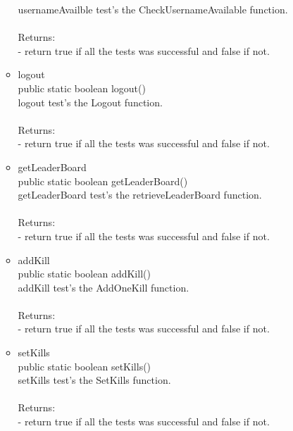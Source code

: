 \documentclass[letterpaper]{article}
\begin{document}
\begin{itemize}
\begin{itemize}
															usernameAvailble test's the CheckUsernameAvailable function. \\ \\
															Returns: \\
															- return true if all the tests was successful and false if not.
															
															\item	logout \\
															 public static boolean logout() \\
				
															logout test's the Logout function. \\ \\
															Returns: \\
															- return true if all the tests was successful and false if not.
															
															\item	getLeaderBoard \\
															public static boolean getLeaderBoard() \\
				
															getLeaderBoard test's the retrieveLeaderBoard function. \\ \\
															Returns: \\
															- return true if all the tests was successful and false if not.
															
															\item	addKill \\
															 public static boolean addKill() \\
				
															addKill test's the AddOneKill function. \\ \\
															Returns: \\
															- return true if all the tests was successful and false if not.
															
															\item	setKills \\
															  public static boolean setKills() \\
				
															setKills test's the SetKills function. \\ \\
															Returns: \\
															- return true if all the tests was successful and false if not.
															

\end{itemize}
\end{itemize}
\end{document}
